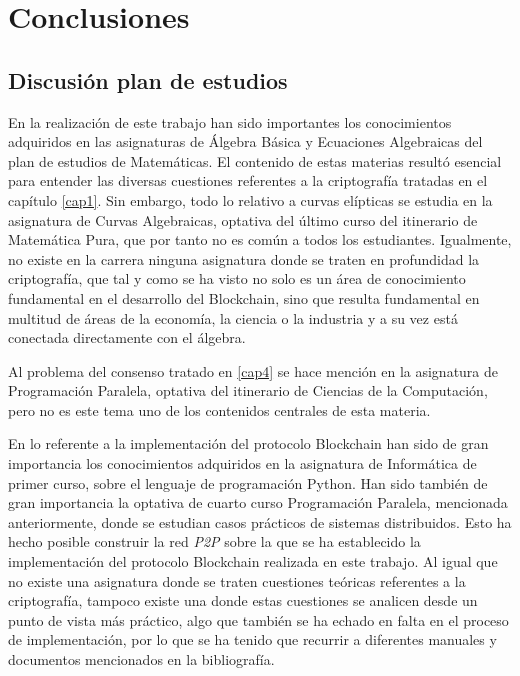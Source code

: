 \cleardoublepage

\chapter{Conclusiones}\label{conclusiones}
\section{Discusión plan de estudios}
En la realización de este trabajo han sido importantes los conocimientos adquiridos en las asignaturas de Álgebra Básica y Ecuaciones Algebraicas del plan de estudios de Matemáticas. El contenido de estas materias resultó esencial para entender las diversas cuestiones referentes a la criptografía tratadas en el capítulo \ref{cap1}. Sin embargo, todo lo relativo a curvas elípticas se estudia en la asignatura de Curvas Algebraicas, optativa del último curso del itinerario de Matemática Pura, que por tanto no es común a todos los estudiantes. Igualmente, no existe en la carrera ninguna asignatura donde se traten en profundidad la criptografía, que tal y como se ha visto no solo es un área de conocimiento fundamental en el desarrollo del Blockchain, sino que resulta fundamental en multitud de áreas de la economía, la ciencia o la industria y a su vez está conectada directamente con el álgebra.

Al problema del consenso tratado en \ref{cap4} se hace mención en la asignatura de Programación Paralela, optativa del itinerario de Ciencias de la Computación, pero no es este tema uno de los contenidos centrales de esta materia.

En lo referente a la implementación del protocolo Blockchain han sido de gran importancia los conocimientos adquiridos en la asignatura de Informática de primer curso, sobre el lenguaje de programación Python. Han sido también de gran importancia la optativa de cuarto curso Programación Paralela, mencionada anteriormente, donde se estudian casos prácticos de sistemas distribuidos. Esto ha hecho posible construir la red \textit{P2P} sobre la que se ha establecido la  implementación del protocolo Blockchain realizada en este trabajo. Al igual que no existe una asignatura donde se traten cuestiones teóricas referentes a la criptografía, tampoco existe una donde estas cuestiones se analicen desde un punto de vista más práctico, algo que también se ha echado en falta en el proceso de implementación, por lo que se ha tenido que recurrir a diferentes manuales y documentos mencionados en la bibliografía.  
